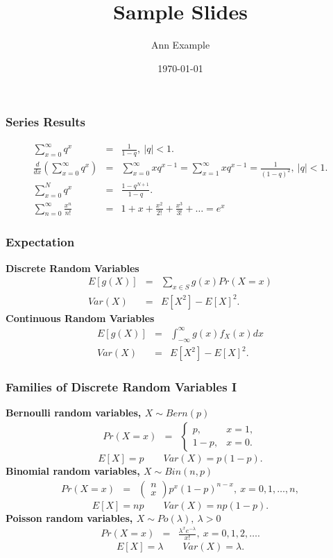 \documentclass[compress]{beamer}
\title{Sample Slides}
\author{Ann Example}
\institute{University of Example}
\date{\today}
\begin{document}
\frame{\titlepage}

\begin{frame}[t]
	\frametitle{Series Results}
	\begin{eqnarray*}
		\sum_{x=0}^{\infty} q^x &=& \frac{1}{1-q}, \ |q|<1. \\
		\frac{d}{dx}\left(\sum_{x=0}^{\infty} q^x \right) &=& \sum_{x=0}^{\infty} xq^{x-1}=\sum_{x=1}^{\infty} xq^{x-1} = \frac{1}{(1-q)^2}, \ |q|<1. \\
		\sum_{x=0}^{N} q^x &=& \frac{1-q^{N+1}}{1-q}. \\
		\sum_{n=0}^{\infty} \frac{x^n}{n!} &=& 1+x+\frac{x^2}{2!}+\frac{x^3}{3!}+\ldots = e^x
	\end{eqnarray*}
\end{frame}

\begin{frame}[t]
\frametitle{Expectation}
{\bf Discrete Random Variables}
\begin{eqnarray*}
E[g(X)] &=& \sum_{x \in S} g(x) Pr(X=x) \\
Var(X)  &=& E[X^2] - E[X]^2.
\end{eqnarray*}
{\bf Continuous Random Variables}
\begin{eqnarray*}
E[g(X)] &=&  \int_{-\infty}^{\infty} g(x) f_X(x) dx \\
Var(X)  &=& E[X^2]-E[X]^2.
\end{eqnarray*}
\end{frame}

\begin{frame}[t]
\frametitle{Families of Discrete Random Variables I}
{\bf Bernoulli random variables, $X \sim Bern(p)$}
\begin{eqnarray*}
Pr(X=x) &=& \left\{ \begin{array}{cc} p, & x=1, \\ 1-p, & x=0. \end{array} \right.
\end{eqnarray*}
\[
E[X] = p \qquad Var(X) = p(1-p).
\]
{\bf Binomial random variables, $X \sim Bin(n,p)$} 
\begin{eqnarray*}
Pr(X=x) &=& \left( \begin{array}{c} n \\ x
      \end{array} \right) p^x (1-p)^{n-x},\  x=0,1,\ldots,n,
\end{eqnarray*}
\[
E[X] = np \qquad Var(X) = np(1-p).
\]
{\bf Poisson random variables, $X \sim Po(\lambda), \ \lambda>0$}
\begin{eqnarray*}
Pr(X=x) &=& \frac{\lambda^x e^{-\lambda}}{x!}, \ x=0,1,2,\ldots.
\end{eqnarray*}
\[
E[X] = \lambda \qquad Var(X) = \lambda.
\]
\end{frame}
\end{document}
